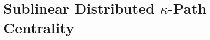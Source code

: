 \documentclass{report}
\newcommand{\algoname}[1]{\textnormal{\textsc{#1}}}
\begin{document}
\section{Sublinear Distributed $\kappa$-Path Centrality}
 \label{kpath:sec:alg}






%
%
\end{document}
